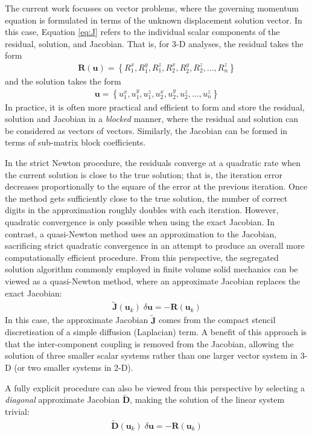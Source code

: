 \documentclass[sn-mathphys,Numbered]{sn-jnl}%
\newcommand{\bb}{\boldsymbol}
\begin{document}
The current work focusses on vector problems, where the governing momentum equation is formulated in terms of the unknown displacement solution vector.
In this case, Equation \ref{eq:J} refers to the individual scalar components of the residual, solution, and Jacobian.
That is, for 3-D analyses, the residual takes the form
\begin{eqnarray}
	\bb{R}(\bb{u}) = \left\{ R_1^x, R_1^y, R_1^z, R_2^x, R_2^y, R_2^z, ..., R_n^z \right\}
\end{eqnarray}
and the solution takes the form
\begin{eqnarray}
	\bb{u} = \left\{ u_1^x, u_1^y, u_1^z, u_2^x, u_2^y, u_2^z, ..., u_n^z \right\}
\end{eqnarray}
In practice, it is often more practical and efficient to form and store the residual, solution and Jacobian in a \emph{blocked} manner, where the residual and solution can be considered as vectors of vectors.
Similarly, the Jacobian can be formed in terms of sub-matrix block coefficients.

In the strict Newton procedure, the residuals converge at a quadratic rate when the current solution is close to the true solution; that is, the iteration error decreases proportionally to the square of the error at the previous iteration.
Once the method gets sufficiently close to the true solution, the number of correct digits in the approximation roughly doubles with each iteration. 
However, quadratic convergence is only possible when using the exact Jacobian.
In contrast, a quasi-Newton method uses an approximation to the Jacobian, sacrificing strict quadratic convergence in an attempt to produce an overall more computationally efficient procedure.
From this perspective, the segregated solution algorithm commonly employed in finite volume solid mechanics can be viewed as a quasi-Newton method, where an approximate Jacobian replaces the exact Jacobian: 
\begin{eqnarray} \label{eq:Seg}
    \bb{\tilde{J}}(\bb{u}_k) \;\delta \bb{u} = -\bb{R}(\bb{u}_k)
\end{eqnarray}
In this case, the approximate Jacobian $\bb{\tilde{J}}$ comes from the compact stencil discretisation of a simple diffusion (Laplacian) term.
A benefit of this approach is that the inter-component coupling is removed from the Jacobian, allowing the solution of three smaller scalar systems rather than one larger vector system in 3-D (or two smaller systems in 2-D).

A fully explicit procedure can also be viewed from this perspective by selecting a \emph{diagonal} approximate Jacobian $\bb{\tilde{D}}$, making the solution of the linear system trivial:
\begin{eqnarray} \label{eq:exp}
    \bb{\tilde{D}}(\bb{u}_k) \;\delta \bb{u} = -\bb{R}(\bb{u}_k)
\end{eqnarray}
\end{document}
